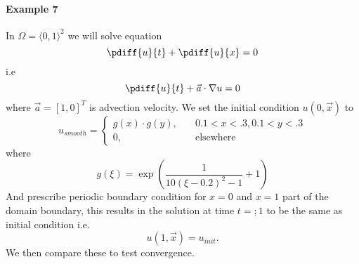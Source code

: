 \newpage
\paragraph{Example 7} In $\Omega = \langle 0, 1 \rangle^2$ we will solve equation
\begin{equation}
		\pdiff{u}{t} +\pdiff{u}{x} = 0
\end{equation}
i.e
\begin{equation}
\pdiff{u}{t} +\vec{a} \cdot \nabla u  = 0
\end{equation}
where $\vec{a} = [1, 0]^T$ is advection velocity. We set the initial condition $u(0, \vec{x})$ to
\begin{equation}
	u_{smooth} = \begin{cases}
				g(x)\cdot g(y),\quad &0.1 < x < .3, 0.1 < y < .3\\
				0, \quad &\text{elsewhere}
	\end{cases}
\end{equation}
where
\begin{equation}
	g(\xi) = \exp\left(\frac{1}{10(\xi - 0.2)^2 - 1}+ 1\right)
\end{equation}
And prescribe periodic boundary condition for $x = 0 $ and $x = 1$ part of the domain boundary, this results in the 
solution at time $t = ;1$ to be the same as initial condition i.e.
\begin{equation}
	u(1, \vec{x}) = u_{init}.
\end{equation}
We then compare these to test convergence.
\begin{figure}[h]
	
	\label{fig:adv_conv}
\end{figure}
